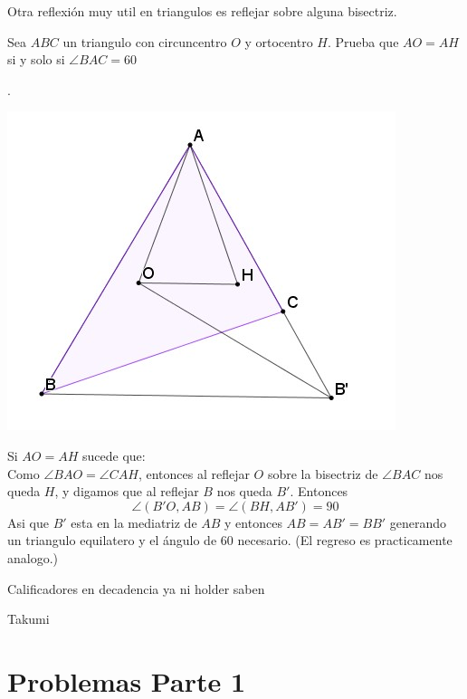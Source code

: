 \documentclass[11pt]{scrartcl}
\begin{document}
    Otra reflexi\'on muy util en triangulos es reflejar sobre alguna bisectriz. 
    \begin{example}
        Sea $ABC$ un triangulo con circuncentro $O$ y ortocentro $H$. Prueba que $AO=AH$ si y solo si $\angle BAC=60$
    \end{example}
    \begin{soln}
    .
        \begin{center}
            \includegraphics[scale=0.5]{Img16.jpg}
        \end{center}
        Si $AO=AH$ sucede que: \\
        Como $\angle BAO=\angle CAH$, entonces al reflejar $O$ sobre la bisectriz de $\angle BAC$ nos queda $H$, y digamos que al reflejar $B$ nos queda $B'$. Entonces 
        $$\angle (B'O, AB)=\angle (BH, AB')=90$$
        Asi que $B'$ esta en la mediatriz de $AB$ y entonces $AB=AB'=BB'$ generando un triangulo equilatero y el \'angulo de 60 necesario. 
        (El regreso es practicamente analogo.)
    \end{soln}
\newpage
\epigraph{Calificadores en decadencia ya ni holder saben}{Takumi}
\section{Problemas Parte 1}
\end{document}
